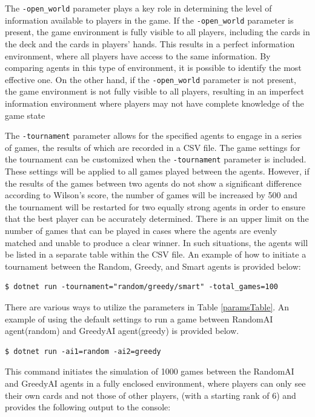 The \texttt{-open\_world} parameter plays a key role in determining the level of information available to players in the game. If the \texttt{-open\_world} parameter is present, the game environment is fully visible to all players, including the cards in the deck and the cards in players' hands. This results in a perfect information environment, where all players have access to the same information. By comparing agents in this type of environment, it is possible to identify the most effective one. On the other hand, if the \texttt{-open\_world} parameter is not present, the game environment is not fully visible to all players, resulting in an imperfect information environment where players may not have complete knowledge of the game state

The \texttt{-tournament} parameter allows for the specified agents to engage in a series of games, the results of which are recorded in a CSV file. The game settings for the tournament can be customized when the \texttt{-tournament} parameter is included. These settings will be applied to all games played between the agents. However, if the results of the games between two agents do not show a significant difference according to Wilson's score, the number of games will be increased by 500 and the tournament will be restarted for two equally strong agents in order to ensure that the best player can be accurately determined. There is an upper limit on the number of games that can be played in cases where the agents are evenly matched and unable to produce a clear winner. In such situations, the agents will be listed in a separate table within the CSV file. An example of how to initiate a tournament between the Random, Greedy, and Smart agents is provided below:

\begin{lstlisting}
$ dotnet run -tournament="random/greedy/smart" -total_games=100
\end{lstlisting}

There are various ways to utilize the parameters in Table \ref{paramsTable}. An example of using the default settings to run a game between RandomAI agent(random) and GreedyAI agent(greedy) is provided below.

\begin{lstlisting}
$ dotnet run -ai1=random -ai2=greedy
\end{lstlisting}

This command initiates the simulation of 1000 games between the RandomAI and GreedyAI agents in a fully enclosed environment, where players can only see their own cards and not those of other players, (with a starting rank of 6) and provides the following output to the console:

